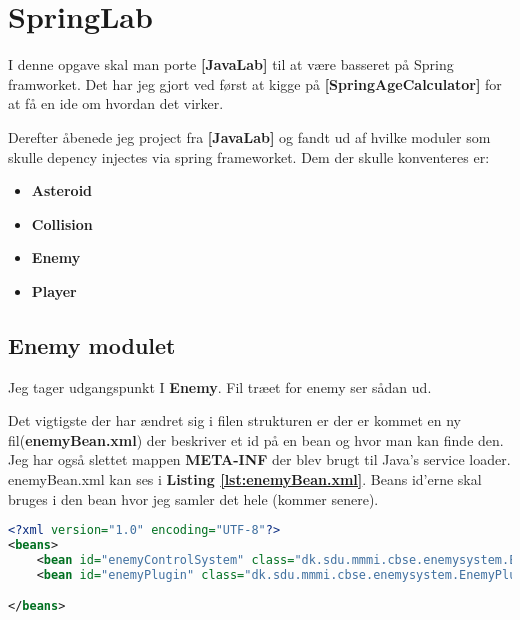\section{SpringLab}
I denne opgave skal man porte \textbf{[JavaLab]}  til at være basseret på Spring
framworket.
Det har jeg gjort ved først at kigge på \textbf{[SpringAgeCalculator]} for at få
en ide om hvordan det virker.

Derefter åbenede jeg project fra \textbf{[JavaLab]} og fandt ud af hvilke moduler som skulle depency injectes via
spring frameworket.
Dem der skulle konventeres er:
\begin{itemize}
    \setlength\itemsep{-0.5em}
    \item \textbf{Asteroid} 
    \item \textbf{Collision} 
    \item \textbf{Enemy} 
    \item \textbf{Player} 
\end{itemize}

\subsection{Enemy modulet}%
\label{sub:enemy_module}


Jeg tager udgangspunkt I \textbf{Enemy}. 
Fil træet for enemy ser sådan ud. 

\hfill \linebreak \hline
{}
\hline \hfill \linebreak

Det vigtigste der har ændret sig i filen strukturen er der er kommet en ny
fil(\textbf{enemyBean.xml}) der beskriver et id på en bean og hvor man kan
finde den. Jeg har også slettet mappen \textbf{META-INF} der blev brugt til
Java's service loader. \\ enemyBean.xml kan ses i \textbf{\textbf{Listing
\ref{lst:enemyBean.xml}}}. Beans id'erne skal bruges i den bean hvor jeg samler
det hele (kommer senere).

\begin{lstlisting}[caption={enemyBean.xml}, label={lst:enemyBean.xml}, language=xml]
<?xml version="1.0" encoding="UTF-8"?>
<beans>
    <bean id="enemyControlSystem" class="dk.sdu.mmmi.cbse.enemysystem.EnemyControlSystem"/>
    <bean id="enemyPlugin" class="dk.sdu.mmmi.cbse.enemysystem.EnemyPlugin"/>

</beans>
\end{lstlisting}


